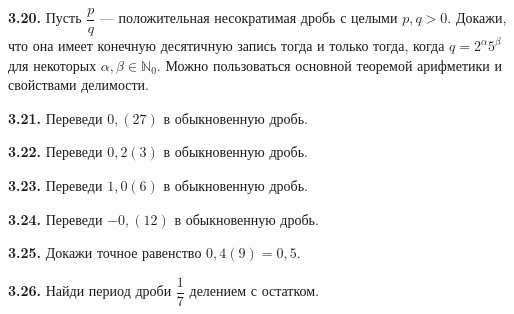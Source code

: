 \noindent\begin{minipage}[t]{\linewidth}\textbf{3.20.}\starmark{} Пусть \(\dfrac pq\) --- положительная несократимая дробь с целыми \(p,q>0\). Докажи, что она имеет конечную десятичную запись тогда и только тогда, когда \(q=2^{\alpha}5^{\beta}\) для некоторых \(\alpha,\beta\in\mathbb N_0\). Можно пользоваться основной теоремой арифметики и свойствами делимости.\par\end{minipage}\par
\noindent\begin{minipage}[t]{\linewidth}\textbf{3.21.} Переведи \(0{,}(27)\) в обыкновенную дробь.\par\end{minipage}\par
\noindent\begin{minipage}[t]{\linewidth}\textbf{3.22.} Переведи \(0{,}2(3)\) в обыкновенную дробь.\par\end{minipage}\par
\noindent\begin{minipage}[t]{\linewidth}\textbf{3.23.} Переведи \(1{,}0(6)\) в обыкновенную дробь.\par\end{minipage}\par
\noindent\begin{minipage}[t]{\linewidth}\textbf{3.24.} Переведи \(-0{,}(12)\) в обыкновенную дробь.\par\end{minipage}\par
\noindent\begin{minipage}[t]{\linewidth}\textbf{3.25.}\starmark{} Докажи точное равенство \(0{,}4(9)=0{,}5\).\par\end{minipage}\par
\noindent\begin{minipage}[t]{\linewidth}\textbf{3.26.} Найди период дроби \(\dfrac17\) делением с остатком.\par\end{minipage}\par
\endgroup
